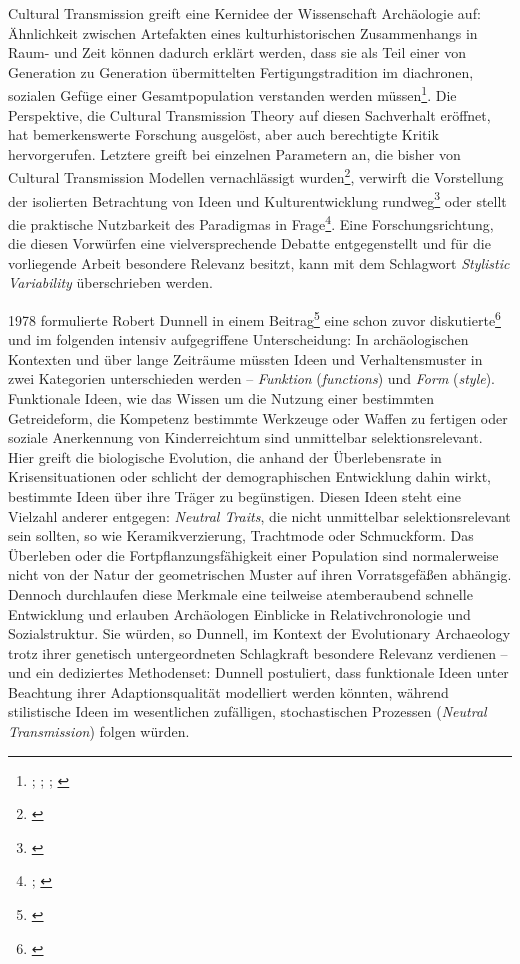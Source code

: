 \documentclass[openany,twoside,twocolumn]{book}
\let\rmarkdownfootnote\footnote%
\def\footnote{\protect\rmarkdownfootnote}
\begin{document}
Cultural Transmission greift eine Kernidee der Wissenschaft Archäologie
auf: Ähnlichkeit zwischen Artefakten eines kulturhistorischen
Zusammenhangs in Raum- und Zeit können dadurch erklärt werden, dass sie
als Teil einer von Generation zu Generation übermittelten
Fertigungstradition im diachronen, sozialen Gefüge einer
Gesamtpopulation verstanden werden müssen\footnote{\textcite{lyman_culture_2001};
  \textcite{lyman_measuring_2000}; \textcite{lyman_rise_1997};
  \textcite{obrien_epistemological_2002}}. Die Perspektive, die Cultural
Transmission Theory auf diesen Sachverhalt eröffnet, hat bemerkenswerte
Forschung ausgelöst, aber auch berechtigte Kritik hervorgerufen.
Letztere greift bei einzelnen Parametern an, die bisher von Cultural
Transmission Modellen vernachlässigt wurden\footnote{\textcite{dobres_creativity_2000}},
verwirft die Vorstellung der isolierten Betrachtung von Ideen und
Kulturentwicklung rundweg\footnote{\textcite{mithen_cognitive_1997}}
oder stellt die praktische Nutzbarkeit des Paradigmas in Frage\footnote{\textcite{dunnell_archaeology_1992};
  \textcite{schiffer_memes_2003}}. Eine Forschungsrichtung, die diesen
Vorwürfen eine vielversprechende Debatte entgegenstellt und für die
vorliegende Arbeit besondere Relevanz besitzt, kann mit dem Schlagwort
\emph{Stylistic Variability} überschrieben werden.

1978 formulierte Robert Dunnell in einem Beitrag\footnote{\textcite{dunnell1978style}}
eine schon zuvor diskutierte\footnote{\textcite{eerkens_cultural_2007}}
und im folgenden intensiv aufgegriffene Unterscheidung: In
archäologischen Kontexten und über lange Zeiträume müssten Ideen und
Verhaltensmuster in zwei Kategorien unterschieden werden --
\emph{Funktion} (\emph{functions}) und \emph{Form} (\emph{style}).
Funktionale Ideen, wie das Wissen um die Nutzung einer bestimmten
Getreideform, die Kompetenz bestimmte Werkzeuge oder Waffen zu fertigen
oder soziale Anerkennung von Kinderreichtum sind unmittelbar
selektionsrelevant. Hier greift die biologische Evolution, die anhand
der Überlebensrate in Krisensituationen oder schlicht der
demographischen Entwicklung dahin wirkt, bestimmte Ideen über ihre
Träger zu begünstigen. Diesen Ideen steht eine Vielzahl anderer
entgegen: \emph{Neutral Traits}, die nicht unmittelbar
selektionsrelevant sein sollten, so wie Keramikverzierung, Trachtmode
oder Schmuckform. Das Überleben oder die Fortpflanzungsfähigkeit einer
Population sind normalerweise nicht von der Natur der geometrischen
Muster auf ihren Vorratsgefäßen abhängig. Dennoch durchlaufen diese
Merkmale eine teilweise atemberaubend schnelle Entwicklung und erlauben
Archäologen Einblicke in Relativchronologie und Sozialstruktur. Sie
würden, so Dunnell, im Kontext der Evolutionary Archaeology trotz ihrer
genetisch untergeordneten Schlagkraft besondere Relevanz verdienen --
und ein dediziertes Methodenset: Dunnell postuliert, dass funktionale
Ideen unter Beachtung ihrer Adaptionsqualität modelliert werden könnten,
während stilistische Ideen im wesentlichen zufälligen, stochastischen
Prozessen (\emph{Neutral Transmission}) folgen würden.
\end{document}
